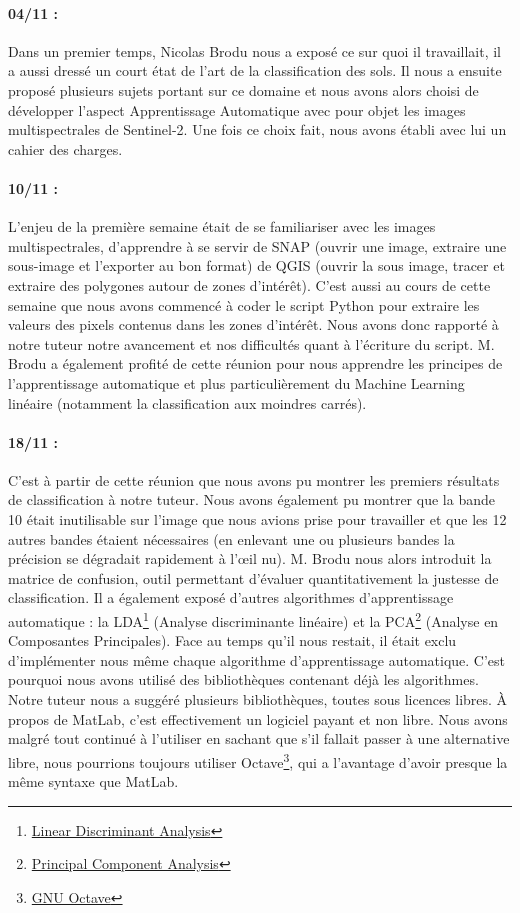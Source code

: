 \documentclass[a4paper,10pt]{report}
\begin{document}
\paragraph{04/11 :} Dans un premier temps, Nicolas Brodu nous a exposé ce sur quoi il travaillait, il a aussi dressé un court état de l'art de la classification des sols. Il nous a ensuite proposé plusieurs sujets portant sur ce domaine et nous avons alors choisi de développer l'aspect Apprentissage Automatique avec pour objet les images multispectrales de Sentinel-2. Une fois ce choix fait, nous avons établi avec lui un cahier des charges.
\paragraph{10/11 :} L'enjeu de la première semaine était de se familiariser avec les images multispectrales, d'apprendre à se servir de SNAP (ouvrir une image, extraire une sous-image et l'exporter au bon format) de QGIS (ouvrir la sous image, tracer et extraire des polygones autour de zones d'intérêt). C'est aussi au cours de cette semaine que nous avons commencé à coder le script Python pour extraire les valeurs des pixels contenus dans les zones d'intérêt. Nous avons donc rapporté à notre tuteur notre avancement et nos difficultés quant à l'écriture du script. M. Brodu a également profité de cette réunion pour nous apprendre les principes de l'apprentissage automatique et plus particulièrement du  Machine Learning  linéaire (notamment la classification aux moindres carrés).
\paragraph{18/11 :} C'est à partir de cette réunion que nous avons pu montrer les premiers résultats de classification à notre tuteur. Nous avons également pu montrer que la bande 10 était inutilisable sur l'image que nous avions prise pour travailler et que les 12 autres bandes étaient nécessaires (en enlevant une ou plusieurs bandes la précision se dégradait rapidement à l'œil nu). M. Brodu nous alors introduit la matrice de confusion, outil permettant d'évaluer quantitativement la justesse de classification. Il a également exposé d'autres algorithmes d'apprentissage automatique : la LDA\footnote{\href{https://en.wikipedia.org/wiki/Linear_discriminant_analysis}{Linear Discriminant Analysis}} (Analyse discriminante linéaire) et la PCA\footnote{\href{https://en.wikipedia.org/wiki/Principal_component_analysis}{Principal Component Analysis}} (Analyse en Composantes Principales). Face au temps qu'il nous restait, il était exclu d'implémenter nous même chaque algorithme d'apprentissage automatique. C'est pourquoi nous avons utilisé des bibliothèques contenant déjà les algorithmes. Notre tuteur nous a suggéré plusieurs bibliothèques, toutes sous licences libres. À propos de MatLab, c'est effectivement un logiciel payant et non libre. Nous avons malgré tout continué à l'utiliser en sachant que s'il fallait passer à une alternative libre, nous pourrions toujours utiliser Octave\footnote{\href{https://www.gnu.org/software/octave/}{GNU Octave}}, qui a l'avantage d'avoir presque la même syntaxe que MatLab.
\end{document}
